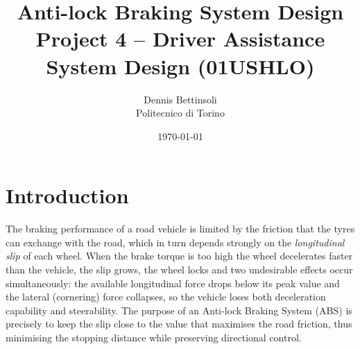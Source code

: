 %
%
%

\title{Anti-lock Braking System Design \\ \large Project 4 -- Driver Assistance System Design (01USHLO)}
\author{Dennis Bettinsoli \\ Politecnico di Torino}
\date{\today}
\maketitle

\section{Introduction}
The braking performance of a road vehicle is limited by the friction
that the tyres can exchange with the road, which in turn depends
strongly on the \emph{longitudinal slip} of each wheel. When the brake
torque is too high the wheel decelerates faster than the vehicle, the
slip grows, the wheel locks and two undesirable effects occur
simultaneously: the available longitudinal force drops below its peak
value and the lateral (cornering) force collapses, so the vehicle loses
both deceleration capability and steerability. The purpose of an
Anti-lock Braking System (ABS) is precisely to keep the slip close to
the value that maximises the road friction, thus minimising the
stopping distance while preserving directional control.


